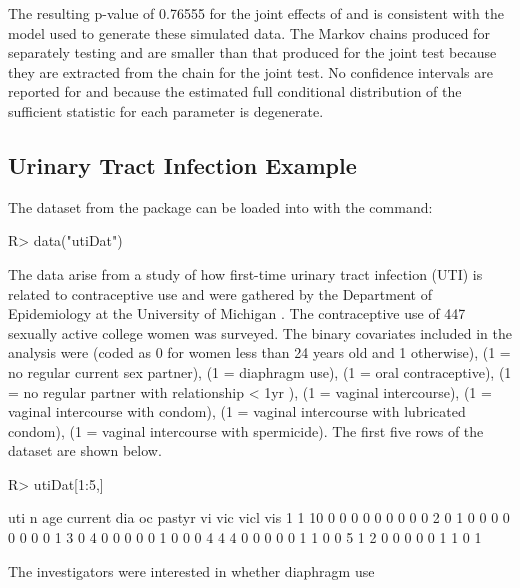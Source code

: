 \documentclass[article, shortnames]{jss}
\begin{document}
The resulting p-value of 0.76555 for the joint effects of
 and  is consistent with the model
used to generate these simulated data. The Markov chains produced
for separately testing  and  are
smaller than that produced for the joint test because they are
extracted from the chain for the joint test. No confidence
intervals are reported for  and 
because the estimated full conditional distribution of the
sufficient statistic for each parameter is degenerate.

\subsection{Urinary Tract Infection Example}
The  dataset from the  package
can be loaded into  with the
command:
\begin{CodeInput}
R> data("utiDat")
\end{CodeInput}
The data arise from a study of how first-time urinary tract
infection (UTI) is related to contraceptive use and were gathered
by the Department of Epidemiology at the University of Michigan
\citep{Cytel:2006}. The contraceptive use of 447 sexually active
college women was surveyed. The binary covariates included in the
analysis were  (coded as 0 for women less than 24 years
old and 1 otherwise),  (1 = no regular current sex
partner),  (1 = diaphragm use),  (1 = oral
contraceptive),  (1 = no regular partner with
relationship < 1yr ),  (1 = vaginal intercourse),
 (1 = vaginal intercourse with condom),  (1 =
vaginal intercourse with lubricated condom),  (1 =
vaginal intercourse with spermicide). The first five rows of the
dataset are shown below.
\begin{CodeChunk}
\begin{CodeInput}
R> utiDat[1:5,]
\end{CodeInput}
\begin{CodeOutput}
  uti  n age current dia oc pastyr vi vic vicl vis
1   1 10   0       0   0  0      0  0   0    0   0
2   0  1   0       0   0  0      0  0   0    0   1
3   0  4   0       0   0  0      0  1   0    0   0
4   4  4   0       0   0  0      0  1   1    0   0
5   1  2   0       0   0  0      0  1   1    0   1
\end{CodeOutput}
\end{CodeChunk}
The investigators were interested in whether diaphragm use
\end{document}
